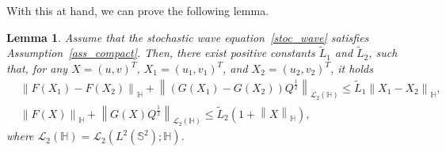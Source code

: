\documentclass[a4paper]{amsart}
\newtheorem{lem}[thm]{Lemma}
\theoremstyle{remark}
\theoremstyle{definition}
\newcommand{\HH}{\mathbb{H}}
\newcommand{\IS}{\mathbb{S}}
\begin{document}
With this at hand, we can prove the following lemma.
\begin{lem}
\label{lip_comp}
Assume that the stochastic wave equation~\eqref{stoc_wave} satisfies Assumption~\ref{ass_compact}. Then, there exist positive constants $\tilde{L}_1$ and $\tilde{L}_2$, such that, for any $X=(u, v)^T$, $X_1=(u_1, v_1)^T$, and $X_2=(u_2, v_2)^T$, it holds 
$$
\begin{aligned}
&\left\|F(X_1)-F(X_2)\right\|_\HH + \left\|\left(G(X_1)-G(X_2)\right)Q^{\frac{1}{2}}\right\|_{\mathcal{L}_2(\HH)}\le \tilde{L}_1\left\|X_1-X_2\right\|_\HH,\\
&\left\|F(X)\right\|_{\HH} + \left\|G(X)Q^{\frac{1}{2}}\right\|_{\mathcal{L}_2(\HH)}\le \tilde{L}_2\left(1+\left\|X\right\|_\HH\right),
\end{aligned}
$$
where $\mathcal{L}_2(\HH) = \mathcal{L}_2(L^2(\IS^2);\HH)$. 
\end{lem}
\end{document}

